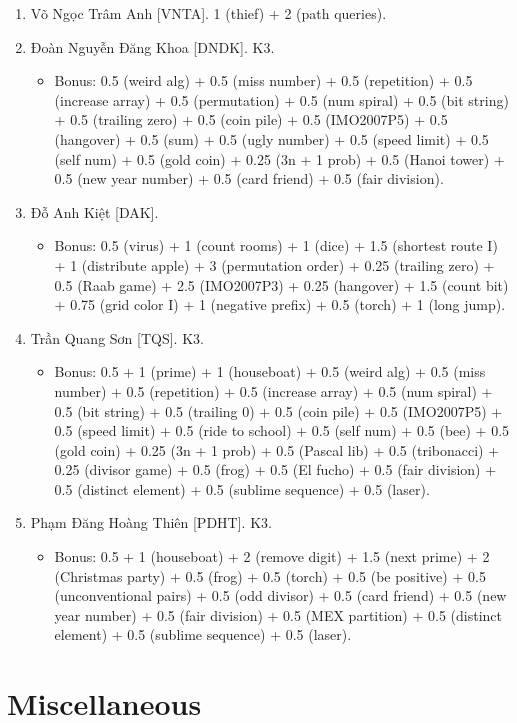 \documentclass{article}
\begin{document}
\begin{enumerate}
	\item {\sc Võ Ngọc Trâm Anh [VNTA].} 1 (thief) + 2 (path queries).
    \item {\sc Đoàn Nguyễn Đăng Khoa [DNDK].} K3.
    \begin{itemize}
        \item Bonus: 0.5 (weird alg) + 0.5 (miss number) + 0.5 (repetition) + 0.5 (increase array) + 0.5 (permutation) + 0.5 (num spiral) + 0.5 (bit string) + 0.5 (trailing zero) + 0.5 (coin pile) + 0.5 (IMO2007P5) + 0.5 (hangover) + 0.5 (sum) + 0.5 (ugly number) + 0.5 (speed limit) + 0.5 (self num) + 0.5 (gold coin) + 0.25 (3n + 1 prob) + 0.5 (Hanoi tower) + 0.5 (new year number) + 0.5 (card friend) + 0.5 (fair division).
    \end{itemize}
	\item {\sc Đỗ Anh Kiệt [DAK].}
	\begin{itemize}
		\item Bonus: 0.5 (virus) + 1 (count rooms) + 1 (dice) + 1.5 (shortest route I)  + 1 (distribute apple) + 3 (permutation order) + 0.25 (trailing zero) + 0.5 (Raab game) + 2.5 (IMO2007P3) + 0.25 (hangover) + 1.5 (count bit) + 0.75 (grid color I) + 1 (negative prefix) + 0.5 (torch) + 1 (long jump).
	\end{itemize}
	\item {\sc Trần Quang Sơn [TQS].} K3.
	\begin{itemize}
		\item Bonus: 0.5 + 1 (prime) + 1 (houseboat) + 0.5 (weird alg) + 0.5 (miss number) + 0.5 (repetition) + 0.5 (increase array) + 0.5 (num spiral) + 0.5 (bit string) + 0.5 (trailing 0) + 0.5 (coin pile) + 0.5 (IMO2007P5) + 0.5 (speed limit) + 0.5 (ride to school) + 0.5 (self num) + 0.5 (bee) + 0.5 (gold coin) + 0.25 (3n + 1 prob) + 0.5 (Pascal lib) + 0.5 (tribonacci) + 0.25 (divisor game) + 0.5 (frog) + 0.5 (El fucho) + 0.5 (fair division) + 0.5 (distinct element) + 0.5 (sublime sequence) + 0.5 (laser).
	\end{itemize}
	\item {\sc Phạm Đăng Hoàng Thiên [PDHT].} K3.
		\begin{itemize}
		\item Bonus: 0.5 + 1 (houseboat) + 2 (remove digit) + 1.5 (next prime) + 2 (Christmas party) + 0.5 (frog) + 0.5 (torch) + 0.5 (be positive) + 0.5 (unconventional pairs) + 0.5 (odd divisor) + 0.5 (card friend) + 0.5 (new year number) + 0.5 (fair division) + 0.5 (MEX partition) + 0.5 (distinct element) + 0.5 (sublime sequence) + 0.5 (laser).
	\end{itemize}
\end{enumerate}


\section{Miscellaneous}


\printbibliography[heading=bibintoc]
\end{document}
